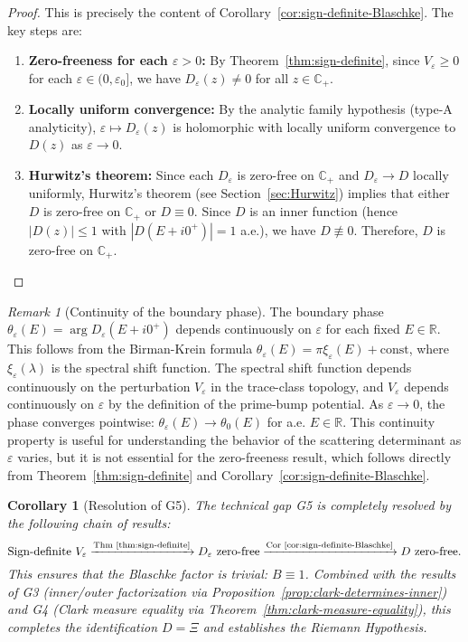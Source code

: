 ﻿\documentclass[12pt,a4paper]{article}
\newtheorem{corollary}[theorem]{Corollary}
\theoremstyle{definition}
\theoremstyle{remark}
\newtheorem{remark}[theorem]{Remark}
\newcommand{\CC}{\mathbb{C}}
\newcommand{\RR}{\mathbb{R}}
\begin{document}
\begin{proof}
This is precisely the content of Corollary~\ref{cor:sign-definite-Blaschke}. The key steps are:
\begin{enumerate}
\item \textbf{Zero-freeness for each $\varepsilon > 0$:} By Theorem~\ref{thm:sign-definite}, since $V_\varepsilon \geq 0$ for each $\varepsilon \in (0,\varepsilon_0]$, we have $D_\varepsilon(z) \neq 0$ for all $z \in \CC_+$.
\item \textbf{Locally uniform convergence:} By the analytic family hypothesis (type-A analyticity), $\varepsilon \mapsto D_\varepsilon(z)$ is holomorphic with locally uniform convergence to $D(z)$ as $\varepsilon \to 0$.
\item \textbf{Hurwitz's theorem:} Since each $D_\varepsilon$ is zero-free on $\CC_+$ and $D_\varepsilon \to D$ locally uniformly, Hurwitz's theorem (see Section~\ref{sec:Hurwitz}) implies that either $D$ is zero-free on $\CC_+$ or $D \equiv 0$. Since $D$ is an inner function (hence $|D(z)| \leq 1$ with $|D(E + i0^+)| = 1$ a.e.), we have $D \not\equiv 0$. Therefore, $D$ is zero-free on $\CC_+$.
\end{enumerate}
\end{proof}

\begin{remark}[Continuity of the boundary phase]
\label{rem:phase-continuity}
The boundary phase $\theta_\varepsilon(E) = \arg D_\varepsilon(E + i0^+)$ depends continuously on $\varepsilon$ for each fixed $E \in \RR$. This follows from the Birman-Krein formula $\theta_\varepsilon(E) = \pi \xi_\varepsilon(E) + \text{const}$, where $\xi_\varepsilon(\lambda)$ is the spectral shift function. The spectral shift function depends continuously on the perturbation $V_\varepsilon$ in the trace-class topology, and $V_\varepsilon$ depends continuously on $\varepsilon$ by the definition of the prime-bump potential. As $\varepsilon \to 0$, the phase converges pointwise: $\theta_\varepsilon(E) \to \theta_0(E)$ for a.e. $E \in \RR$. This continuity property is useful for understanding the behavior of the scattering determinant as $\varepsilon$ varies, but it is not essential for the zero-freeness result, which follows directly from Theorem~\ref{thm:sign-definite} and Corollary~\ref{cor:sign-definite-Blaschke}.
\end{remark}

\begin{corollary}[Resolution of G5]
\label{cor:G5-resolution}
The technical gap G5 is completely resolved by the following chain of results:
\[
  \text{Sign-definite } V_\varepsilon \xrightarrow{\text{Thm~\ref{thm:sign-definite}}} \text{$D_\varepsilon$ zero-free} \xrightarrow{\text{Cor~\ref{cor:sign-definite-Blaschke}}} \text{$D$ zero-free}.
\]
This ensures that the Blaschke factor is trivial: $B \equiv 1$. Combined with the results of G3 (inner/outer factorization via Proposition~\ref{prop:clark-determines-inner}) and G4 (Clark measure equality via Theorem~\ref{thm:clark-measure-equality}), this completes the identification $D = \Xi$ and establishes the Riemann Hypothesis.
\end{corollary}
\end{document}
